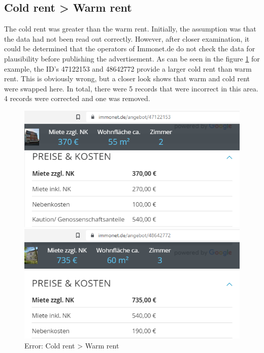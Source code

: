 \subsection{Cold rent > Warm rent}

The cold rent was greater than the warm rent. Initially, the assumption was that the data had not been read out correctly. However, after closer examination, it could be determined that the operators of Immonet.de do not check the data for plausibility before publishing the advertisement. As can be seen in the figure \ref{fig: error kalt > warm} for example, the ID's 47122153 and 48642772 provide a larger cold rent than warm rent. This is obviously wrong, but a closer look shows that warm and cold rent were swapped here. In total, there were 5 records that were incorrect in this area. 4 records were corrected and one was removed. 

\begin{figure}[H]
	\begin{center}
		\begin{minipage}{0.4\textwidth}
			\includegraphics[width=0.7\linewidth]{img/47122153}
		\end{minipage}
		\begin{minipage}{0.4\textwidth}
			\includegraphics[width=0.7\linewidth]{img/48642772}
		\end{minipage}
	\end{center}
	\caption{Error: Cold rent > Warm rent }
	\label{fig: error kalt > warm}
\end{figure}

